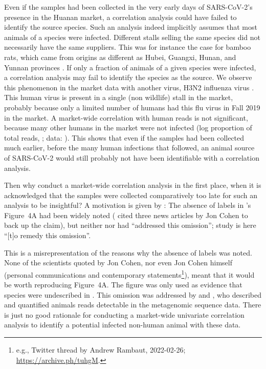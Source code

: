 \documentclass[11pt]{article}
\def \sct {\mbox{SARS-CoV-2}}
\begin{document}
Even if the samples had been collected in the very early days of \sct{}'s presence in the Huanan market, a correlation analysis could have failed to identify the source species. Such an analysis indeed implicitly assumes that most animals of a species were infected. Different stalls selling the same species did not necessarily have the same suppliers. This was for instance the case for bamboo rats, which came from origins as different as Hubei, Guangxi, Hunan, and Yunnan provinces \citep[annexes pp.189--191]{WHO2021}. If only a fraction of animals of a given species were infected, a correlation analysis may fail to identify the species as the source. We observe this phenomenon in the market data with another virus, H3N2 influenza virus \citep{ACC2023bioRxiv}. This human virus is present in a single (non wildlife) stall in the market, probably because only a limited number of humans had this flu virus in Fall 2019 in the market. A market-wide correlation with human reads is not significant, because many other humans in the market were not infected (log proportion of total reads, \ACCAllHNHS{}; data: \citet{ACC2023bioRxiv}). This shows that even if the samples had been collected much earlier, before the many human infections that followed, an animal source of \sct{} would still probably not have been identifiable with a correlation analysis. 

Then why conduct a market-wide correlation analysis in the first place, when it is acknowledged that the samples were collected comparatively too late for such an analysis to be insightful? A motivation is given by \citet{Bloom2023VE}: The absence of labels in \citet{Liu2022RS}'s Figure~4A had been widely noted (\citet{Bloom2023VE} cited three news articles by Jon Cohen to back up the claim), but neither \citet{ACC2023Zenodo} nor \citet{Liu2023Nature} had ``addressed this omission''; \citet{Bloom2023VE} study is here ``[t]o remedy this omission''. 

This is a misrepresentation of the reasons why the absence of labels was noted. None of the scientists quoted by Jon Cohen, nor even Jon Cohen himself (personal communications and contemporary statements\footnote{e.g., Twitter thread by Andrew Rambaut, 2022-02-26; \url{https://archive.ph/tuhgM}.}), meant that it would be worth reproducing Figure~4A. The figure was only used as evidence that species were undescribed in \citet{Liu2022RS}. This omission was addressed by \citet{ACC2023Zenodo} and \citet{Liu2023Nature}, who described and quantified animals reads detectable in the metagenomic sequence data. There is just no good rationale for conducting a market-wide univariate correlation analysis to identify a potential infected non-human animal with these data. 
\end{document}
